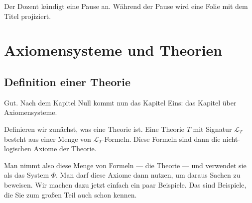 \begin{math-stroke}
\end{math-stroke}

\begin{lecture-break}[Pause]
Der Dozent kündigt eine Pause an. Während der Pause wird eine Folie mit dem Titel  projiziert.
\end{lecture-break}

\section{Axiomensysteme und Theorien}
\subsection{Definition einer Theorie}

\begin{spoken-clean}[01:19:32 - 01:21:42]
Gut. Nach dem Kapitel Null kommt nun das Kapitel Eins: das Kapitel über Axiomensysteme.

Definieren wir zunächst, was eine Theorie ist. Eine Theorie $T$ mit Signatur $\mathcal{L}_T$ besteht aus einer Menge von $\mathcal{L}_T$-Formeln. Diese Formeln sind dann die nicht-logischen Axiome der Theorie.

Man nimmt also diese Menge von Formeln --- die Theorie --- und verwendet sie als das System $\Phi$. Man darf diese Axiome dann nutzen, um daraus Sachen zu beweisen. Wir machen dazu jetzt einfach ein paar Beispiele. Das sind Beispiele, die Sie zum großen Teil auch schon kennen.
\end{spoken-clean}

\begin{math-stroke}
\end{math-stroke}

